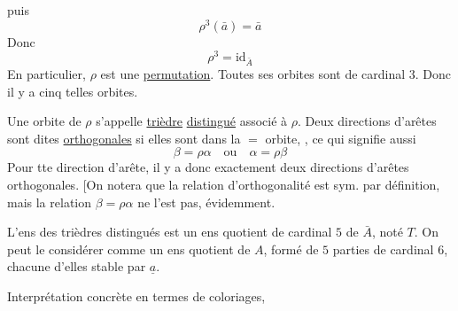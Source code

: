 puis
\[
\rho^3(\bar a)=\bar a
\]
Donc
\[
\rho^3=\mathrm{id}_{\bar A}
\]
En particulier, $\rho$ est une \uline{permutation}. Toutes ses orbites sont de cardinal 3. Donc il y a cinq telles orbites.

Une orbite de $\rho$ s'appelle \uline{trièdre} \uline{distingué}  associé à $\rho$. Deux directions d'arêtes \inserted{$\alpha,\beta$} sont dites \uline{orthogonales} si elles sont  dans la $=$ orbite, , ce qui signifie aussi
\[
\beta=\rho\alpha\quad\text{ou}\quad\alpha=\rho\beta
\]
Pour tte  direction d'arête, il y a donc exactement deux directions d'arêtes orthogonales. [On notera que la relation d'orthogonalité est sym. par définition, mais la relation $\beta=\rho\alpha$ \deleted{\unsure{$\alpha$}}  ne l'est pas, évidemment.\unsure{]}

L'ens des trièdres distingués est un ens quotient de cardinal $5$ de $\bar A$, noté  $T$.  On peut le considérer comme un ens quotient de $A$, formé de $5$ parties de cardinal $6$, chacune d'elles stable par $\underline a$.

Interprétation concrète en termes de coloriages,

